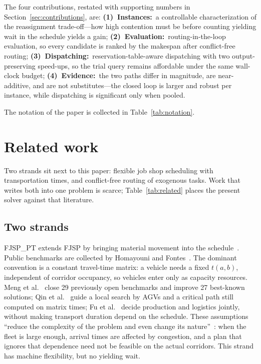 The four contributions, restated with supporting numbers in Section~\ref{sec:contributions}, are:
\textbf{(1)~Instances:}~a controllable characterization of the reassignment trade-off---how high contention must be before counting yielding wait in the schedule yields a gain;
\textbf{(2)~Evaluation:}~routing-in-the-loop evaluation, so every candidate is ranked by the makespan after conflict-free routing;
\textbf{(3)~Dispatching:}~reservation-table-aware dispatching with two output-preserving speed-ups, so the trial query remains affordable under the same wall-clock budget;
\textbf{(4)~Evidence:}~the two paths differ in magnitude, are near-additive, and are not substitutes---the closed loop is larger and robust per instance, while dispatching is significant only when pooled.

The notation of the paper is collected in Table~\ref{tab:notation}.



\section{Related work}
\label{sec:Chapter_II}

Two strands sit next to this paper: flexible job shop scheduling with transportation times, and conflict-free routing of exogenous tasks.
Work that writes both into one problem is scarce; Table~\ref{tab:related} places the present solver against that literature.

\subsection{Two strands}

FJSP\_PT extends FJSP by bringing material movement into the schedule~\cite{xin2025review,dauzereperes2024fjsp}.
Public benchmarks are collected by Homayouni and Fontes~\cite{homayouni2021production}.
The dominant convention is a constant travel-time matrix: a vehicle needs a fixed $t(a,b)$, independent of corridor occupancy, so vehicles enter only as capacity resources.
Meng et al.~\cite{meng2025cp} close 29 previously open benchmarks and improve 27 best-known solutions; Qin et al.~\cite{qin2026knowledge} guide a local search by AGVs and a critical path still computed on matrix times; Fu et al.~\cite{fu2025integrated} decide production and logistics jointly, without making transport duration depend on the schedule.
These assumptions ``reduce the complexity of the problem and even change its nature''~\cite{xin2025review}: when the fleet is large enough, arrival times are affected by congestion, and a plan that ignores that dependence need not be feasible on the actual corridors.
This strand has machine flexibility, but no yielding wait.


